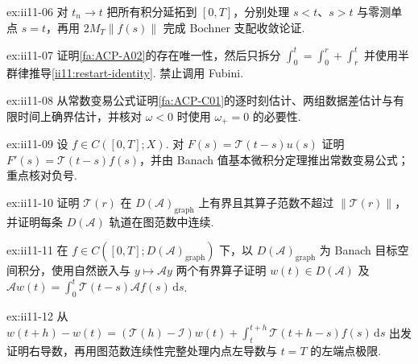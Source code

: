 \begin{FAExercise}{ex:ii11-06}
对 \(\displaystyle t_n\to t\) 把所有积分延拓到 \(\displaystyle[0,T]\)，分别处理 \(\displaystyle s<t\)、\(\displaystyle s>t\) 与零测单点 \(\displaystyle s=t\)，再用 \(\displaystyle2M_T\|f(s)\|\) 完成 Bochner 支配收敛论证.
\end{FAExercise}

\begin{FAExercise}[温和解的重新起步恒等式]{ex:ii11-07}
证明\autoref{fa:ACP-A02}的存在唯一性，然后只拆分 \(\displaystyle\int_0^t=\int_0^r+\int_r^t\) 并使用半群律推导\autoref{ii11:restart-identity}. 禁止调用 Fubini.
\end{FAExercise}

\begin{FAExercise}[温和解的数据稳定性]{ex:ii11-08}
从常数变易公式证明\autoref{fa:ACP-C01}的逐时刻估计、两组数据差估计与有限时间上确界估计，并核对 \(\displaystyle\omega<0\) 时使用 \(\displaystyle\omega_+=0\) 的必要性.
\end{FAExercise}

\begin{FAExercise}[经典推出温和]{ex:ii11-09}
设 \(\displaystyle f\in C([0,T];X)\). 对 \(\displaystyle F(s)=\mathcal T(t-s)u(s)\) 证明 \(\displaystyle F'(s)=\mathcal T(t-s)f(s)\)，并由 Banach 值基本微积分定理推出常数变易公式；重点核对负号.
\end{FAExercise}

\begin{FAExercise}[图空间半群]{ex:ii11-10}
证明 \(\displaystyle\mathcal T(r)\) 在 \(\displaystyle D(\mathcal A)_{\mathrm{graph}}\) 上有界且其算子范数不超过 \(\displaystyle\|\mathcal T(r)\|\)，并证明每条 \(\displaystyle D(\mathcal A)\) 轨道在图范数中连续.
\end{FAExercise}

\begin{FAExercise}{ex:ii11-11}
在 \(\displaystyle f\in C([0,T];D(\mathcal A)_{\mathrm{graph}})\) 下，以 \(\displaystyle D(\mathcal A)_{\mathrm{graph}}\) 为 Banach 目标空间积分，使用自然嵌入与 \(\displaystyle y\mapsto\mathcal Ay\) 两个有界算子证明 \(\displaystyle w(t)\in D(\mathcal A)\) 及 \(\displaystyle\mathcal Aw(t)=\int_0^t\mathcal T(t-s)\mathcal Af(s)\,\mathrm{d}s\).
\end{FAExercise}

\begin{FAExercise}[温和提升为经典]{ex:ii11-12}
从 \(\displaystyle w(t+h)-w(t)=(\mathcal T(h)-\mathcal I)w(t)+\int_t^{t+h}\mathcal T(t+h-s)f(s)\,\mathrm{d}s\) 出发证明右导数，再用图范数连续性完整处理内点左导数与 \(\displaystyle t=T\) 的左端点极限.
\end{FAExercise}

